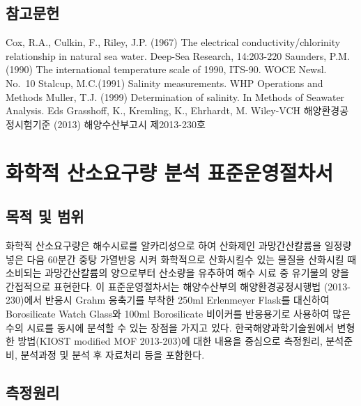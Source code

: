 \documentclass[
]{book}
\begin{document}
\hypertarget{uxcc38uxace0uxbb38uxd5cc-2}{%
\section{참고문헌}\label{uxcc38uxace0uxbb38uxd5cc-2}}

Cox, R.A., Culkin, F., Riley, J.P. (1967) The electrical conductivity/chlorinity relationship in natural sea water. Deep-Sea Research, 14:203-220
Saunders, P.M. (1990) The international temperature scale of 1990, ITS-90. WOCE Newsl. No.~10
Stalcup, M.C.(1991) Salinity measurements. WHP Operations and Methods
Muller, T.J. (1999) Determination of salinity. In Methods of Seawater Analysis. Eds Grasshoff, K., Kremling, K., Ehrhardt, M. Wiley-VCH
해양환경공정시험기준 (2013) 해양수산부고시 제2013-230호

\hypertarget{uxd654uxd559uxc801-uxc0b0uxc18cuxc694uxad6cuxb7c9-uxbd84uxc11d-uxd45cuxc900uxc6b4uxc601uxc808uxcc28uxc11c}{%
\chapter{화학적 산소요구량 분석 표준운영절차서}\label{uxd654uxd559uxc801-uxc0b0uxc18cuxc694uxad6cuxb7c9-uxbd84uxc11d-uxd45cuxc900uxc6b4uxc601uxc808uxcc28uxc11c}}

\hypertarget{uxbaa9uxc801-uxbc0f-uxbc94uxc704-2}{%
\section{목적 및 범위}\label{uxbaa9uxc801-uxbc0f-uxbc94uxc704-2}}

화학적 산소요구량은 해수시료를 알카리성으로 하여 산화제인 과망간산칼륨을 일정량 넣은 다음 60분간 중탕 가열반응 시켜 화학적으로 산화시킬수 있는 물질을 산화시킬 때 소비되는 과망간산칼륨의 양으로부터 산소량을 유추하여 해수 시료 중 유기물의 양을 간접적으로 표현한다. 이 표준운영절차서는 해양수산부의 해양환경공정시행법 (2013-230)에서 반응시 Grahm 응축기를 부착한 250ml Erlenmeyer Flask를 대신하여 Borosilicate Watch Glass와 100ml Borosilicate 비이커를 반응용기로 사용하여 많은 수의 시료를 동시에 분석할 수 있는 장점을 가지고 있다. 한국해양과학기술원에서 변형한 방법(KIOST modified MOF 2013-203)에 대한 내용을 중심으로 측정원리, 분석준비, 분석과정 및 분석 후 자료처리 등을 포함한다.

\hypertarget{uxce21uxc815uxc6d0uxb9ac-1}{%
\section{측정원리}\label{uxce21uxc815uxc6d0uxb9ac-1}}
\end{document}
